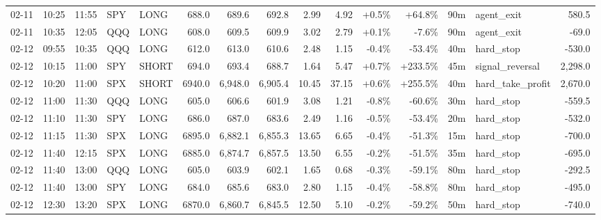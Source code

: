 \documentclass[11pt,a4paper,twoside]{article}
\begin{document}
\begin{landscape}
\begin{center}
\begin{longtable}{>{\color{txtmain}}l l l l l r r r r r r r r >{\color{txtmain}}l r}
02-11 & 10:25 & 11:55 & SPY & LONG & 688.0 & 689.6 & 692.8 & 2.99 & 4.92 & \textcolor{wingreen}{+0.5\%} & \textcolor{wingreen}{+64.8\%} & 90m & agent\_exit & \textcolor{wingreen}{580.5} \\
02-11 & 10:35 & 12:05 & QQQ & LONG & 608.0 & 609.5 & 609.9 & 3.02 & 2.79 & \textcolor{wingreen}{+0.1\%} & \textcolor{lossred}{-7.6\%} & 90m & agent\_exit & \textcolor{lossred}{-69.0} \\
02-12 & 09:55 & 10:35 & QQQ & LONG & 612.0 & 613.0 & 610.6 & 2.48 & 1.15 & \textcolor{lossred}{-0.4\%} & \textcolor{lossred}{-53.4\%} & 40m & hard\_stop & \textcolor{lossred}{-530.0} \\
02-12 & 10:15 & 11:00 & SPY & SHORT & 694.0 & 693.4 & 688.7 & 1.64 & 5.47 & \textcolor{wingreen}{+0.7\%} & \textcolor{wingreen}{+233.5\%} & 45m & signal\_reversal & \textcolor{wingreen}{2,298.0} \\
02-12 & 10:20 & 11:00 & SPX & SHORT & 6940.0 & 6,948.0 & 6,905.4 & 10.45 & 37.15 & \textcolor{wingreen}{+0.6\%} & \textcolor{wingreen}{+255.5\%} & 40m & hard\_take\_profit & \textcolor{wingreen}{2,670.0} \\
02-12 & 11:00 & 11:30 & QQQ & LONG & 605.0 & 606.6 & 601.9 & 3.08 & 1.21 & \textcolor{lossred}{-0.8\%} & \textcolor{lossred}{-60.6\%} & 30m & hard\_stop & \textcolor{lossred}{-559.5} \\
02-12 & 11:10 & 11:30 & SPY & LONG & 686.0 & 687.0 & 683.6 & 2.49 & 1.16 & \textcolor{lossred}{-0.5\%} & \textcolor{lossred}{-53.4\%} & 20m & hard\_stop & \textcolor{lossred}{-532.0} \\
02-12 & 11:15 & 11:30 & SPX & LONG & 6895.0 & 6,882.1 & 6,855.3 & 13.65 & 6.65 & \textcolor{lossred}{-0.4\%} & \textcolor{lossred}{-51.3\%} & 15m & hard\_stop & \textcolor{lossred}{-700.0} \\
02-12 & 11:40 & 12:15 & SPX & LONG & 6885.0 & 6,874.7 & 6,857.5 & 13.50 & 6.55 & \textcolor{lossred}{-0.2\%} & \textcolor{lossred}{-51.5\%} & 35m & hard\_stop & \textcolor{lossred}{-695.0} \\
02-12 & 11:40 & 13:00 & QQQ & LONG & 605.0 & 603.9 & 602.1 & 1.65 & 0.68 & \textcolor{lossred}{-0.3\%} & \textcolor{lossred}{-59.1\%} & 80m & hard\_stop & \textcolor{lossred}{-292.5} \\
02-12 & 11:40 & 13:00 & SPY & LONG & 684.0 & 685.6 & 683.0 & 2.80 & 1.15 & \textcolor{lossred}{-0.4\%} & \textcolor{lossred}{-58.8\%} & 80m & hard\_stop & \textcolor{lossred}{-495.0} \\
02-12 & 12:30 & 13:20 & SPX & LONG & 6870.0 & 6,860.7 & 6,845.5 & 12.50 & 5.10 & \textcolor{lossred}{-0.2\%} & \textcolor{lossred}{-59.2\%} & 50m & hard\_stop & \textcolor{lossred}{-740.0} \\

\end{longtable}
\end{center}
\end{landscape}
\end{document}
